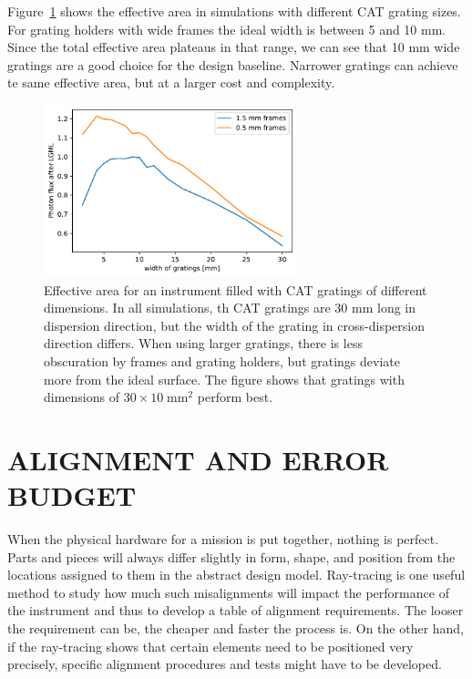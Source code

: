 \documentclass[]{spie}  %
\begin{document}
Figure~\ref{fig:width} shows the effective area in simulations with different CAT grating sizes. For grating holders with wide frames the ideal width is between 5 and 10 mm. Since the total effective area plateaus in that range, we can see that 10 mm wide gratings are a good choice for the design baseline. Narrower gratings can achieve te same effective area, but at a larger cost and complexity. 
\begin{figure} [ht]
  \begin{center}
    \includegraphics[height=5cm]{catdimensions.pdf}
  \end{center}
  \caption
      { \label{fig:width}Effective area for an instrument filled with CAT gratings of different dimensions. In all simulations, th CAT gratings are 30 mm long in dispersion direction, but the width of the grating in cross-dispersion direction differs. When using larger gratings, there is less obscuration by frames and grating holders, but gratings deviate more from the ideal surface. The figure shows that gratings with dimensions of $30\times10\;\mathrm{mm}^2$ perform best.
}
\end{figure}

\section{ALIGNMENT AND ERROR BUDGET}
\label{sect:align}
When the physical hardware for a mission is put together, nothing is perfect. Parts and pieces will always differ slightly in form, shape, and position from the locations assigned to them in the abstract design model. Ray-tracing is one useful method to study how much such misalignments will impact the performance of the instrument and thus to develop a table of alignment requirements. The looser the requirement can be, the cheaper and faster the process is. On the other hand, if the ray-tracing shows that certain elements need to be positioned very precisely, specific alignment procedures and tests might have to be developed.
\end{document}

